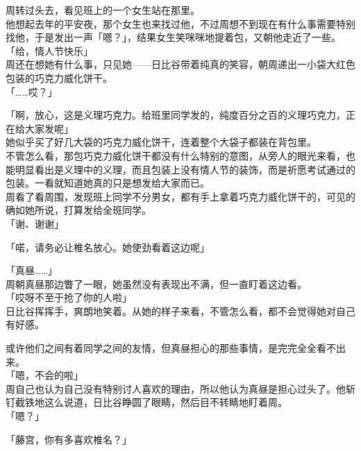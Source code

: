 周转过头去，看见班上的一个女生站在那里。\\

他想起去年的平安夜，那个女生也来找过他，不过周想不到现在有什么事需要特别找他，于是发出一声「嗯？」，结果女生笑咪咪地提着包，又朝他走近了一些。\\

「给，情人节快乐」\\

周还在想她有什么事，只见她——日比谷带着纯真的笑容，朝周递出一小袋大红色包装的巧克力威化饼干。\\

「……哎？」

「啊，放心，这是义理巧克力。给班里同学发的，纯度百分之百的义理巧克力，正在给大家发呢」\\

她似乎买了好几大袋的巧克力威化饼干，连着整个大袋子都装在背包里。\\

不管怎么看，那包巧克力威化饼干都没有什么特别的意图，从旁人的眼光来看，也能明显看出是义理中的义理，而且包装上没有情人节的装饰，而是祈愿考试通过的包装。一看就知道她真的只是想发给大家而已。\\

周看了看周围，发现班上同学不分男女，都有手上拿着巧克力威化饼干的，可见的确如她所说，打算发给全班同学。\\

「谢、谢谢」

「喏，请务必让椎名放心。她使劲看着这边呢」

「真昼……」\\

周朝真昼那边瞥了一眼，她虽然没有表现出不满，但一直盯着这边看。\\

「哎呀不至于抢了你的人啦」\\

日比谷挥挥手，爽朗地笑着。从她的样子来看，不管怎么看，都不会觉得她对自己有好感。

或许他们之间有着同学之间的友情，但真昼担心的那些事情，是完完全全看不出来。\\

「嗯，不会的啦」\\

周自己也认为自己没有特别讨人喜欢的理由，所以他认为真昼是担心过头了。他斩钉截铁地这么说道，日比谷睁圆了眼睛，然后目不转睛地盯着周。\\

「嗯？」

「藤宫，你有多喜欢椎名？」\\

